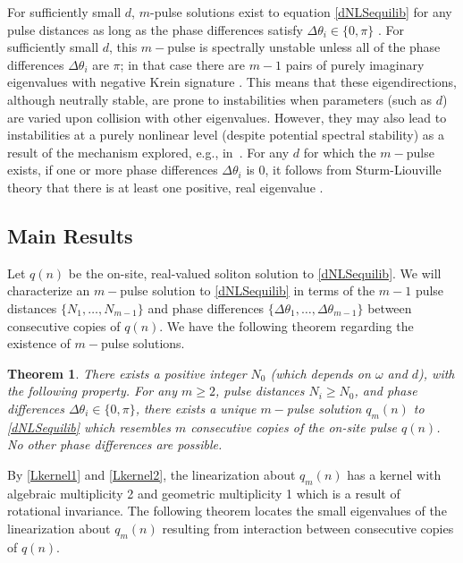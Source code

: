 \documentclass[12pt]{article}
\newtheorem{theorem}{Theorem}
\begin{document}
For sufficiently small $d$, $m$-pulse solutions exist to equation \eqref{dNLSequilib} for any pulse distances as long as the phase differences satisfy $\Delta \theta_i \in \{0, \pi\}$ \cite[Proposition 2.1]{Pelinovsky2005}. For sufficiently small $d$, this $m-$pulse is spectrally unstable unless all of the phase differences $\Delta \theta_i$ are $\pi$; in that case there are $m-1$ pairs of purely imaginary eigenvalues with negative Krein signature \cite[Theorem 3.6]{Pelinovsky2005}.
This means that these eigendirections, although neutrally
stable, are prone to instabilities when parameters 
(such as $d$) are varied upon collision with other
eigenvalues. However, they may also lead to instabilities
at a purely nonlinear level (despite potential spectral
stability) as a result of the mechanism explored, e.g.,
in~\cite{CUCCAGNA200938,PRL_2015}.
For any $d$ for which the $m-$pulse exists, if one or more phase differences $\Delta \theta_i$ is 0, it follows from Sturm-Liouville theory that there is at least one positive, real eigenvalue \cite{Kapitula2001a}.

\subsection{Main Results}

Let $q(n)$ be the on-site, real-valued soliton solution to \eqref{dNLSequilib}. We will characterize an $m-$pulse solution to \eqref{dNLSequilib} in terms of the $m-1$ pulse distances $\{ N_1, \dots, N_{m-1} \}$ and phase differences $\{ \Delta\theta_1, \dots, \Delta\theta_{m-1} \}$ between consecutive copies of $q(n)$. We have the following theorem regarding the existence of $m-$pulse solutions.

\begin{theorem}\label{dNLSexisttheorem}
There exists a positive integer $N_0$ (which depends on $\omega$ and $d$), with the following property. For any $m \geq 2$, pulse distances $N_i \geq N_0$, and phase differences $\Delta\theta_i \in \{0, \pi\}$, there exists a unique $m-$pulse solution $q_m(n)$ to \eqref{dNLSequilib} which resembles $m$ consecutive copies of the on-site pulse $q(n)$. No other phase differences are possible.
\end{theorem}

By \eqref{Lkernel1} and \eqref{Lkernel2}, the linearization about $q_m(n)$ has a kernel with algebraic multiplicity 2 and geometric multiplicity 1 which is a result of rotational invariance. The following theorem locates the small eigenvalues of the linearization about $q_m(n)$ resulting from interaction between consecutive copies of $q(n)$. 
\end{document}

